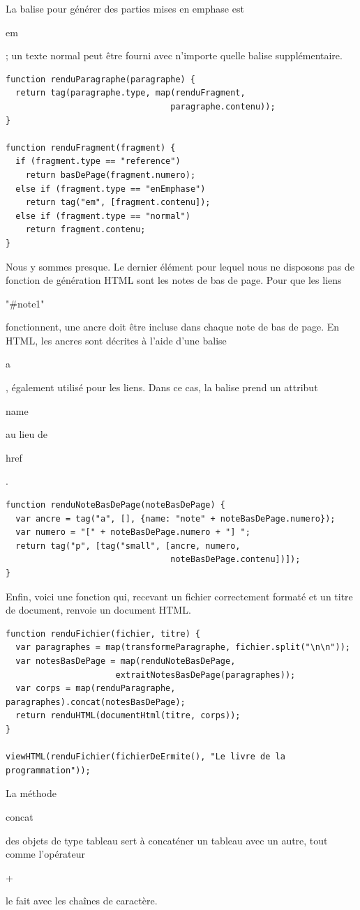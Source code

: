 \documentclass{FramateX}
\renewcommand{\texttt}[1]{\begin{sffamily}{#1}\end{sffamily}}
\begin{document}
La balise pour générer des parties mises en emphase est \texttt{em} ; un
texte normal peut être fourni avec n'importe quelle balise
supplémentaire.

\begin{lstlisting}
function renduParagraphe(paragraphe) {
  return tag(paragraphe.type, map(renduFragment,
                                 paragraphe.contenu));
}

function renduFragment(fragment) {
  if (fragment.type == "reference")
    return basDePage(fragment.numero);
  else if (fragment.type == "enEmphase")
    return tag("em", [fragment.contenu]);
  else if (fragment.type == "normal")
    return fragment.contenu;
}
\end{lstlisting}
\begin{center}\end{center}

Nous y sommes presque. Le dernier élément pour lequel nous ne disposons
pas de fonction de génération HTML sont les notes de bas de page. Pour
que les liens \texttt{"\#note1"} fonctionnent, une ancre doit être
incluse dans chaque note de bas de page. En HTML, les ancres sont
décrites à l'aide d'une balise \texttt{a}, également utilisé pour les
liens. Dans ce cas, la balise prend un attribut \texttt{name} au lieu de
\texttt{href}.

\begin{lstlisting}
function renduNoteBasDePage(noteBasDePage) {
  var ancre = tag("a", [], {name: "note" + noteBasDePage.numero});
  var numero = "[" + noteBasDePage.numero + "] ";
  return tag("p", [tag("small", [ancre, numero,
                                 noteBasDePage.contenu])]);
}
\end{lstlisting}
Enfin, voici une fonction qui, recevant un fichier correctement formaté
et un titre de document, renvoie un document HTML.

\begin{lstlisting}
function renduFichier(fichier, titre) {
  var paragraphes = map(transformeParagraphe, fichier.split("\n\n"));
  var notesBasDePage = map(renduNoteBasDePage,
                      extraitNotesBasDePage(paragraphes));
  var corps = map(renduParagraphe, paragraphes).concat(notesBasDePage);
  return renduHTML(documentHtml(titre, corps));
}

viewHTML(renduFichier(fichierDeErmite(), "Le livre de la programmation"));
\end{lstlisting}
La méthode \texttt{concat} des objets de type tableau sert à concaténer
un tableau avec un autre, tout comme l'opérateur \texttt{+} le fait avec
les chaînes de caractère.
\end{document}
